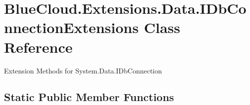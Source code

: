 \hypertarget{class_blue_cloud_1_1_extensions_1_1_data_1_1_i_db_connection_extensions}{}\section{Blue\+Cloud.\+Extensions.\+Data.\+I\+Db\+Connection\+Extensions Class Reference}
\label{class_blue_cloud_1_1_extensions_1_1_data_1_1_i_db_connection_extensions}


Extension Methods for System.\+Data.\+I\+Db\+Connection  


\subsection*{Static Public Member Functions}
